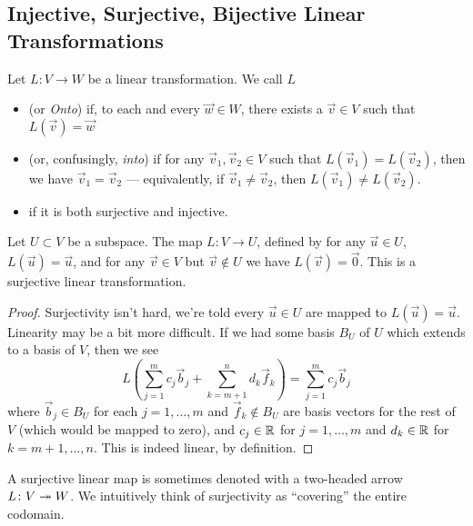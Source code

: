 \subsection{Injective, Surjective, Bijective Linear Transformations}

\begin{definition}
  Let $L\colon V\to W$ be a linear transformation. We call $L$
  \begin{itemize}
  \item {} (or \emph{Onto}) if, to each and every $\vec{w}\in W$,
    there exists a $\vec{v}\in V$ such that $L(\vec{v})=\vec{w}$
  \item {} (or, confusingly, \emph{into}) if for any
    $\vec{v}_{1},\vec{v}_{2}\in V$ such that
    $L(\vec{v}_{1})=L(\vec{v}_{2})$, then we have
    $\vec{v}_{1}=\vec{v}_{2}$ --- equivalently, if
    $\vec{v}_{1}\neq\vec{v}_{2}$, then $L(\vec{v}_{1})\neq L(\vec{v}_{2})$.
  \item {} if it is both surjective and injective.
  \end{itemize}
\end{definition}

\begin{example}
Let $U\subset V$ be a subspace. The map $L\colon V\to U$, defined by for
any $\vec{u}\in U$, $L(\vec{u})=\vec{u}$, and for any $\vec{v}\in V$ but
$\vec{v}\notin U$ we have $L(\vec{v})=\vec{0}$. This is a surjective
linear transformation.

\begin{proof}
Surjectivity isn't hard, we're told every $\vec{u}\in U$ are mapped to
$L(\vec{u})=\vec{u}$. Linearity may be a bit more difficult. If we had
some basis $B_{U}$ of $U$ which extends to a basis of $V$, then we see
\begin{equation}
L(\sum_{j=1}^{m}c_{j}\vec{b}_{j} + \sum_{k=m+1}^{n}d_{k}\vec{f}_{k}) = \sum^{m}_{j=1}c_{j}\vec{b}_{j}
\end{equation}
where $\vec{b}_{j}\in B_{U}$ for each $j=1,\dots,m$ and
$\vec{f}_{k}\notin B_{U}$ are basis vectors for the rest of $V$ (which
would be mapped to zero), and $c_{j}\in\mathbb{R}$ for $j=1,\dots,m$ and
$d_{k}\in\mathbb{R}$ for $k=m+1,\dots,n$. This is indeed linear, by definition.
\end{proof}
\end{example}

A surjective linear map is sometimes denoted with a two-headed arrow
$L\colon V\twoheadrightarrow W$. We intuitively think of surjectivity as ``covering''
the entire codomain.

